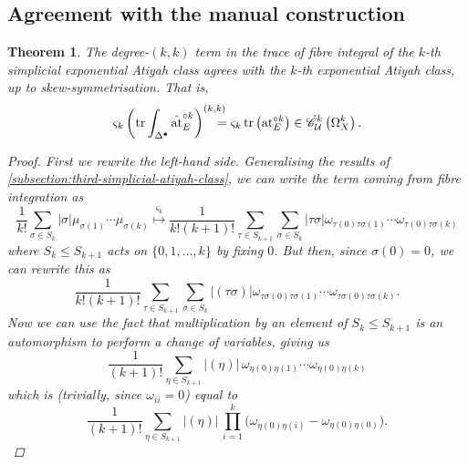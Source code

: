 \documentclass[11pt,fleqn]{article}
\theoremstyle{plain}
\newtheorem{theorem}{Theorem}[subsection]
\theoremstyle{definition}
\theoremstyle{remark}
\numberwithin{equation}{theorem}
\newcommand{\cover}{\mathcal{U}}
\newcommand{\cech}{\check{\mathscr{C}}}
\newcommand{\at}{\mathrm{at}}
\newcommand{\expat}[1]{\at^{\circ#1}}
\newcommand{\simpexpat}[1]{\hat{\at}^{\circ#1}}
\newcommand{\sym}[1]{S_{#1}}
\newcommand{\sgn}[1]{|#1|}
\renewcommand{\ss}[1]{\varsigma_{#1}}
\begin{document}
    \subsection{Agreement with the manual construction}

        \begin{theorem}\label{theorem:simplicial-atiyah-agrees-with-manual-atiyah}
            The degree-$(k,k)$ term in the trace of fibre integral of the $k$-th simplicial {exponential} Atiyah class agrees with the $k$-th {exponential} Atiyah class, up to skew-symmetrisation.
            That is,
            \[
                \ss{k}\left(
                    \tr\int_{\Delta^\bullet}\simpexpat{k}_E
                \right)^{(k,k)}\!\!\!\!\!\!
                =
                \ss{k}\tr\left(
                    \expat{k}_E
                \right)
                \in \cech^k_\cover\left(\Omega_X^k\right).
            \]
            \begin{proof}
                First we rewrite the left-hand side.
                Generalising the results of \cref{subsection:third-simplicial-atiyah-class}, we can write the term coming from fibre integration as
                \[
                    \frac{1}{k!} \sum_{\sigma\in\sym{k}}
                        \sgn{\sigma}\mu_{\sigma(1)} \cdots \mu_{\sigma(k)}
                    \overset{\ss{k}}{\longmapsto}
                    \frac{1}{k!(k+1)!} \sum_{\tau\in \sym{k+1}}
                        \sum_{\sigma\in\sym{k}}
                            \sgn{\tau\sigma}\omega_{\tau(0)\tau\sigma(1)} \cdots \omega_{\tau(0)\tau\sigma(k)}
                \]
                where $\sym{k}\leqslant\sym{k+1}$ acts on $\{0,1,\ldots,k\}$ by fixing $0$.
                But then, since $\sigma(0)=0$, we can rewrite this as
                \[
                    \frac{1}{k!(k+1)!} \sum_{\tau\in S_{k+1}}
                        \sum_{\sigma\in S_{k}}
                            \sgn{(\tau\sigma)}\omega_{\tau\sigma(0)\tau\sigma(1)} \cdots \omega_{\tau\sigma(0)\tau\sigma(k)}.
                \]
                Now we can use the fact that multiplication by an element of $\sym{k}\leqslant \sym{k+1}$ is an automorphism to perform a change of variables, giving us
                \[
                    \frac{1}{(k+1)!}\sum_{\eta\in S_{k+1}}\sgn{(\eta)}\,\omega_{\eta(0)\eta(1)}\cdots\omega_{\eta(0)\eta(k)}
                \]
                which is (trivially, since $\omega_{ii}=0$) equal to
                \[
                    \frac{1}{(k+1)!}\sum_{\eta\in S_{k+1}}\sgn{(\eta)}\,\prod_{i=1}^k\big(\omega_{\eta(0)\eta(i)}-\omega_{\eta(0)\eta(0)}\big).
                \]


\end{proof}
\end{theorem}
\end{document}
